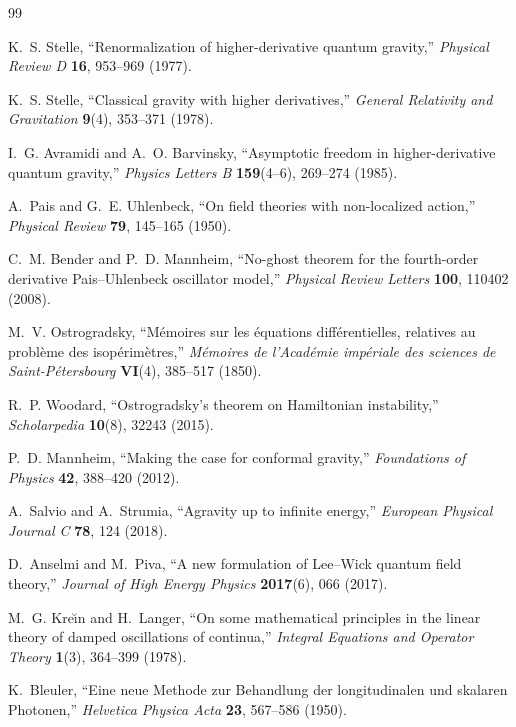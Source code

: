 \documentclass[12pt,a4paper]{article}
\theoremstyle{remark}
\begin{document}
\begin{thebibliography}{99}

K.~S. Stelle,
``Renormalization of higher-derivative quantum gravity,''
\textit{Physical Review D} \textbf{16}, 953--969 (1977).

K.~S. Stelle,
``Classical gravity with higher derivatives,''
\textit{General Relativity and Gravitation} \textbf{9}(4), 353--371 (1978).

I.~G. Avramidi and A.~O. Barvinsky,
``Asymptotic freedom in higher-derivative quantum gravity,''
\textit{Physics Letters B} \textbf{159}(4--6), 269--274 (1985).

A.~Pais and G.~E. Uhlenbeck,
``On field theories with non-localized action,''
\textit{Physical Review} \textbf{79}, 145--165 (1950).

C.~M. Bender and P.~D. Mannheim,
``No-ghost theorem for the fourth-order derivative Pais--Uhlenbeck oscillator model,''
\textit{Physical Review Letters} \textbf{100}, 110402 (2008).

M.~V. Ostrogradsky,
``M\'{e}moires sur les \'{e}quations diff\'{e}rentielles,
relatives au probl\`{e}me des isop\'{e}rim\`{e}tres,''
\textit{M\'{e}moires de l'Acad\'{e}mie imp\'{e}riale des sciences
de Saint-P\'{e}tersbourg} \textbf{VI}(4), 385--517 (1850).

R.~P. Woodard,
``Ostrogradsky's theorem on Hamiltonian instability,''
\textit{Scholarpedia} \textbf{10}(8), 32243 (2015).

P.~D. Mannheim,
``Making the case for conformal gravity,''
\textit{Foundations of Physics} \textbf{42}, 388--420 (2012).

A.~Salvio and A.~Strumia,
``Agravity up to infinite energy,''
\textit{European Physical Journal C} \textbf{78}, 124 (2018).

D.~Anselmi and M.~Piva,
``A new formulation of Lee--Wick quantum field theory,''
\textit{Journal of High Energy Physics} \textbf{2017}(6), 066 (2017).

M.~G. Kre\u{\i}n and H.~Langer,
``On some mathematical principles in the linear theory of damped oscillations
of continua,''
\textit{Integral Equations and Operator Theory} \textbf{1}(3), 364--399 (1978).

K.~Bleuler,
``Eine neue Methode zur Behandlung der longitudinalen und skalaren Photonen,''
\textit{Helvetica Physica Acta} \textbf{23}, 567--586 (1950).


\end{thebibliography}
\end{document}
